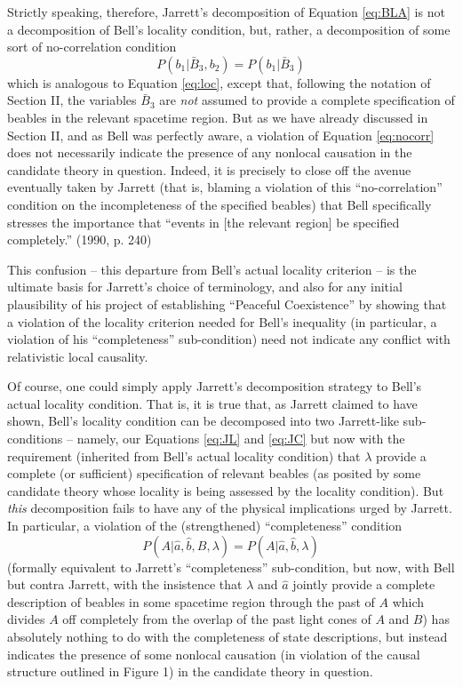 \documentclass[12pt]{article}
\begin{document}
Strictly speaking,
therefore, Jarrett's decomposition of Equation \ref{eq:BLA}
is not a decomposition of
Bell's locality condition, but, rather, a decomposition of some sort of
no-correlation condition 
\begin{equation}
P(b_1 | \bar{B}_3, b_2) = P(b_1 | \bar{B}_3)
\label{eq:nocorr}
\end{equation}
which is analogous to Equation \ref{eq:loc}, except that, following
the notation of Section II, the variables $\bar{B}_3$ are \emph{not} 
assumed to provide a complete specification of
beables in the relevant spacetime region.  But as we have already
discussed in Section II, and as Bell was perfectly aware,
a violation of Equation \ref{eq:nocorr} does
not necessarily indicate the presence of any nonlocal causation in the
candidate theory in question.  Indeed, it is precisely to close off the
avenue eventually taken by Jarrett (that is, blaming a violation of this
``no-correlation'' condition on the incompleteness of the specified
beables) that Bell specifically stresses the importance that ``events
in [the relevant region] be specified completely.'' (1990, p. 240)


This confusion -- this departure from Bell's
actual locality criterion -- is the ultimate basis for Jarrett's
choice of terminology, and also for any initial plausibility of his
project of establishing ``Peaceful Coexistence'' by showing that a
violation of the locality criterion needed for Bell's inequality (in
particular, a violation of his ``completeness'' sub-condition) need
not indicate any conflict with relativistic local causality. 

Of course, one could simply apply Jarrett's decomposition strategy to
Bell's actual locality condition.  That is, it is true that, as
Jarrett claimed to have shown, Bell's locality condition can be
decomposed into two Jarrett-like sub-conditions -- namely, our
Equations \ref{eq:JL} and \ref{eq:JC} but now with the requirement
(inherited from Bell's actual locality condition) that $\lambda$ 
provide a complete (or sufficient) specification of relevant beables
(as posited by some candidate theory whose locality is being assessed
by the locality condition).  
But \emph{this} decomposition fails to have any of the physical
implications urged by Jarrett.  In particular, a violation of the
(strengthened) ``completeness'' condition 
\begin{equation}
P(A|\hat{a},\hat{b},B,\lambda) = P(A|\hat{a},\hat{b},\lambda)
\label{eq:BJcomp2}
\end{equation}
(formally equivalent to Jarrett's ``completeness'' sub-condition, but now,
with Bell but contra Jarrett, with the insistence that $\lambda$ and 
$\hat{a}$ jointly provide a complete description of beables in some
spacetime region through the past of $A$ which divides $A$ off
completely from the overlap of the past light cones of $A$ and $B$)
has absolutely nothing to do with the completeness of state descriptions,
but instead indicates the
presence of some nonlocal causation (in violation of the causal
structure outlined in Figure 1) in the candidate theory in question.
\end{document}
